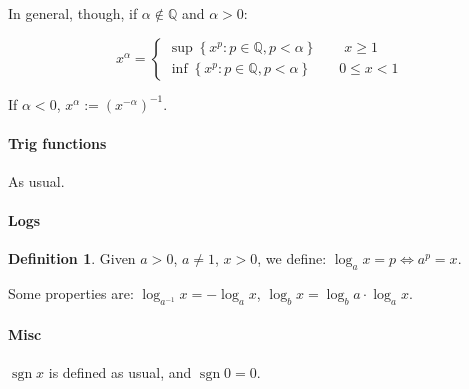 \documentclass[12pt,a4paper]{report}
\numberwithin{equation}{section}
\DeclareMathOperator{\sgn}{sgn}
\theoremstyle{definition}
\newtheorem{definition}{Definition}[section]
\theoremstyle{remark}
\begin{document}
In general, though, if $\alpha \notin \mathbb{Q}$ and $\alpha > 0$:

\begin{equation}
x^\alpha=\begin{cases}
\sup \left\lbrace x^p: p \in \mathbb{Q}, p < \alpha \right\rbrace \qquad x\geq 1  \\
\inf \left\lbrace x^p: p \in \mathbb{Q}, p < \alpha \right\rbrace \qquad 0\leq x<1 
\end{cases}
\end{equation}

If $\alpha<0$, $x^\alpha := (x^{-\alpha})^{-1}$.

\paragraph{Trig functions}

As usual.

\paragraph{Logs}

\begin{definition}
Given $a>0$, $a\neq 1$, $x>0$, we define: $\log_a x = p \iff a^p = x$.
\end{definition}

Some properties are:
$\log_{a^{-1}} x = -\log_a x$, $\log_b x = \log_b a \cdot \log_a x$. 

\paragraph{Misc}

$\sgn x$ is defined as usual, and $\sgn 0 = 0$.

\tableofcontents
\end{document}
